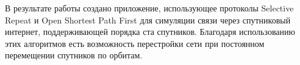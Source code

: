 В результате работы создано приложение, использующее протоколы Selective Repeat и Open Shortest Path First для симуляции связи через спутниковый интернет, поддерживающей порядка ста спутников. Благодаря использованию этих алгоритмов есть возможность перестройки сети при постоянном перемещении спутников по орбитам.